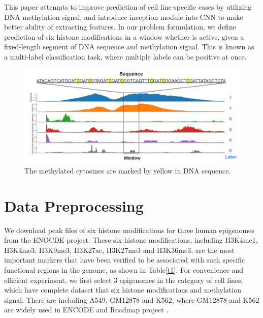 \hspace{24pt}

This paper attempts to improve prediction of cell line-specific cases by utilizing DNA methylation signal, and introduce inception module into CNN to make better ability of extracting features. In our problem formulation, we define prediction of six histone modifications in a window whether is active, given a fixed-length segment of DNA sequence and methylation signal. This is known as a multi-label classification task, where multiple labels can be positive at once.

\begin{figure}[H]
    \centering
    \includegraphics[width=1\columnwidth]{body/figure/figure3.png}
    \captionsetup{labelfont=bf}
    \renewcommand{\baselinestretch}{1.0}
    \caption[Pair of input and label]{The methylated cytosines are marked by yellow in DNA sequence.}
    \label{f3}
\end{figure}

\section{Data Preprocessing}
We download peak files of six histone modifications for three human epigenomes from the ENOCDE project. These six histone modifications, including H3K4me1, H3K4me3, H3K9me3, H3K27ac, H3K27me3 and H3K36me3, are the most important markers that have been verified to be associated with such specific functional regions in the genome, as shown in Table\ref{t1}. For convenience and efficient experiment, we first select 3 epigenomes in the category of cell lines, which have complete dataset that six histone modifications and methylation signal. There are including A549, GM12878 and K562, where GM12878 and K562 are widely used in ENCODE and Roadmap project \cite{davis2018encyclopedia}\cite{kundaje2015integrative}.

